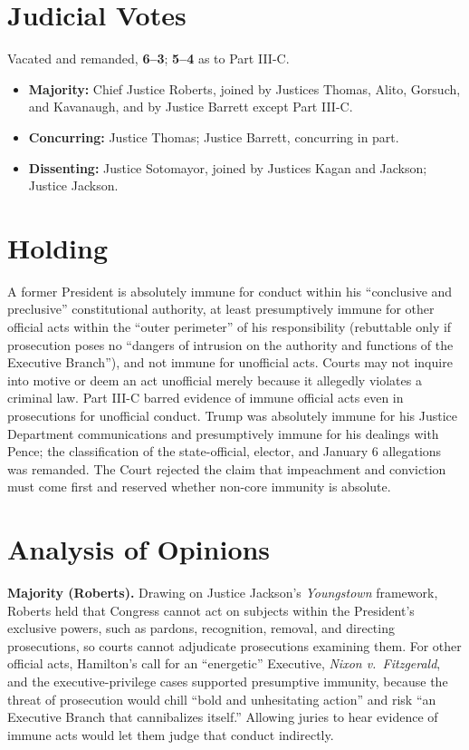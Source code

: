 \documentclass[12pt]{article}
\begin{document}
\section{Judicial Votes}

Vacated and remanded, \textbf{6--3}; \textbf{5--4} as to Part III-C.
\begin{itemize}
\item \textbf{Majority:} Chief Justice Roberts, joined by Justices Thomas, Alito, Gorsuch, and Kavanaugh, and by Justice Barrett except Part III-C.
\item \textbf{Concurring:} Justice Thomas; Justice Barrett, concurring in part.
\item \textbf{Dissenting:} Justice Sotomayor, joined by Justices Kagan and Jackson; Justice Jackson.
\end{itemize}

\section{Holding}

A former President is absolutely immune for conduct within his ``conclusive and preclusive'' constitutional authority, at least presumptively immune for other official acts within the ``outer perimeter'' of his responsibility (rebuttable only if prosecution poses no ``dangers of intrusion on the authority and functions of the Executive Branch''), and not immune for unofficial acts. Courts may not inquire into motive or deem an act unofficial merely because it allegedly violates a criminal law. Part III-C barred evidence of immune official acts even in prosecutions for unofficial conduct. Trump was absolutely immune for his Justice Department communications and presumptively immune for his dealings with Pence; the classification of the state-official, elector, and January 6 allegations was remanded. The Court rejected the claim that impeachment and conviction must come first and reserved whether non-core immunity is absolute.

\section{Analysis of Opinions}

\textbf{Majority (Roberts).} Drawing on Justice Jackson's \textit{Youngstown} framework, Roberts held that Congress cannot act on subjects within the President's exclusive powers, such as pardons, recognition, removal, and directing prosecutions, so courts cannot adjudicate prosecutions examining them. For other official acts, Hamilton's call for an ``energetic'' Executive, \textit{Nixon v.\ Fitzgerald}, and the executive-privilege cases supported presumptive immunity, because the threat of prosecution would chill ``bold and unhesitating action'' and risk ``an Executive Branch that cannibalizes itself.'' Allowing juries to hear evidence of immune acts would let them judge that conduct indirectly.
\end{document}
